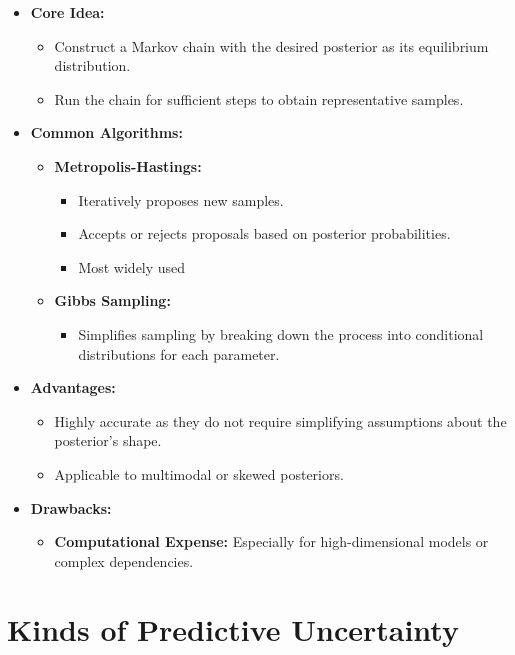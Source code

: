 \begin{itemize}
    \item \textbf{Core Idea:}
    \begin{itemize}
        \item Construct a Markov chain with the desired posterior as its equilibrium distribution.
        \item Run the chain for sufficient steps to obtain representative samples.
    \end{itemize}
    \item \textbf{Common Algorithms:}
    \begin{itemize}
        \item \textbf{Metropolis-Hastings:}
        \begin{itemize}
            \item Iteratively proposes new samples.
            \item Accepts or rejects proposals based on posterior probabilities.
            \item Most widely used
        \end{itemize}
        \item \textbf{Gibbs Sampling:}
        \begin{itemize}
            \item Simplifies sampling by breaking down the process into conditional distributions for each parameter.
        \end{itemize}
    \end{itemize}
    \item \textbf{Advantages:}
    \begin{itemize}
        \item Highly accurate as they do not require simplifying assumptions about the posterior's shape.
        \item Applicable to multimodal or skewed posteriors.
    \end{itemize}
    \item \textbf{Drawbacks:}
    \begin{itemize}
        \item \textbf{Computational Expense:} Especially for high-dimensional models or complex dependencies.
    \end{itemize}
\end{itemize}

\section{Kinds of Predictive Uncertainty}

